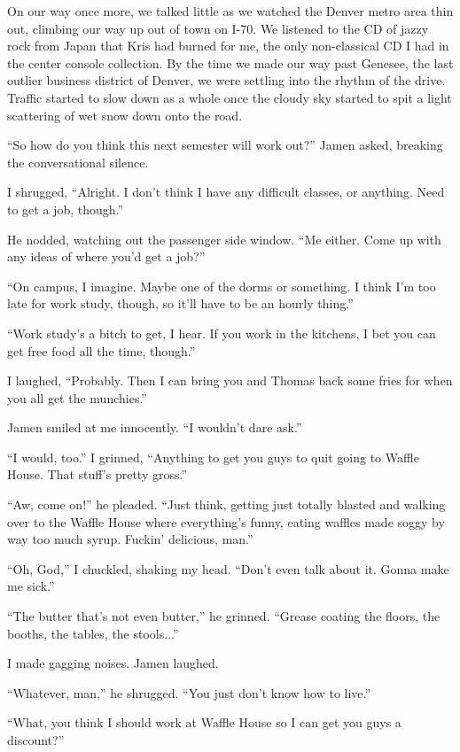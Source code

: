 On our way once more, we talked little as we watched the Denver metro area thin out, climbing our way up out of town on I-70.  We listened to the CD of jazzy rock from Japan that Kris had burned for me, the only non-classical CD I had in the center console collection.  By the time we made our way past Genesee, the last outlier business district of Denver, we were settling into the rhythm of the drive.  Traffic started to slow down as a whole once the cloudy sky started to spit a light scattering of wet snow down onto the road.

``So how do you think this next semester will work out?'' Jamen asked, breaking the conversational silence.

I shrugged, ``Alright.  I don't think I have any difficult classes, or anything.  Need to get a job, though.''

He nodded, watching out the passenger side window.  ``Me either.  Come up with any ideas of where you'd get a job?''

``On campus, I imagine.  Maybe one of the dorms or something.  I think I'm too late for work study, though, so it'll have to be an hourly thing.''

``Work study's a bitch to get, I hear.  If you work in the kitchens, I bet you can get free food all the time, though.''

I laughed, ``Probably.  Then I can bring you and Thomas back some fries for when you all get the munchies.''

Jamen smiled at me innocently.  ``I wouldn't dare ask.''

``I would, too.''  I grinned, ``Anything to get you guys to quit going to Waffle House.  That stuff's pretty gross.''

``Aw, come on!'' he pleaded.  ``Just think, getting just totally blasted and walking over to the Waffle House where everything's funny, eating waffles made soggy by way too much syrup.  Fuckin' delicious, man.''

``Oh, God,'' I chuckled, shaking my head.  ``Don't even talk about it.  Gonna make me sick.''

``The butter that's not even butter,'' he grinned.  ``Grease coating the floors, the booths, the tables, the stools...''

I made gagging noises.  Jamen laughed.

``Whatever, man,'' he shrugged.  ``You just don't know how to live.''

``What, you think I should work at Waffle House so I can get you guys a discount?''

